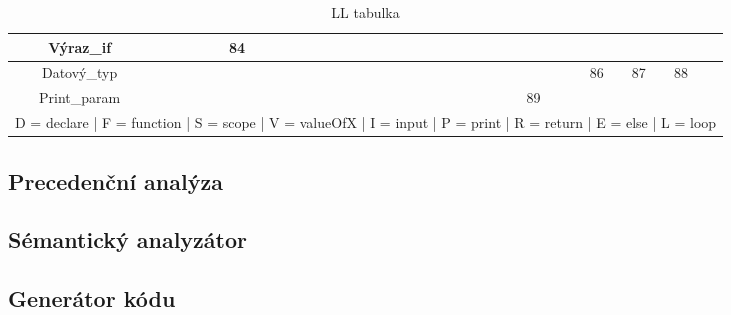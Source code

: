 \documentclass[11pt, a4paper]{article}
\begin{document}
\begin{table}[h]
{{\begin{tabular}{|c|c|c|c|c|c|c|c|c|c|c|c|c|c|c|c|c|c|c|c|c|c|c|}
				Výraz\_if           &         &          &       & 84 &    &    &     &    &    &       &       &        &     &      &      &    &     &         &         &        &        &    \\ \hline
				Datový\_typ         &         &          &       &    &    &    &     &    &    &       &       &        &     &      &      &    &     &         & 86      & 87     & 88     &    \\ \hline
				Print\_param        &         &          &       &    &    &    &     &    &    &       &       &        &     &      &      &    & 89  &         &         &        &        &    \\ \hline
				\multicolumn{23}{c}{D = declare | F = function | S = scope | V = valueOfX | I = input | P = print | R = return | E = else | L = loop }
			\end{tabular}
			}}
			\caption{LL tabulka}
			\label{gramatika}
		\end{table}

		
		
	\subsection{Precedenční analýza}
	\subsection{Sémantický analyzátor}
	\subsection{Generátor kódu}
\end{document}
